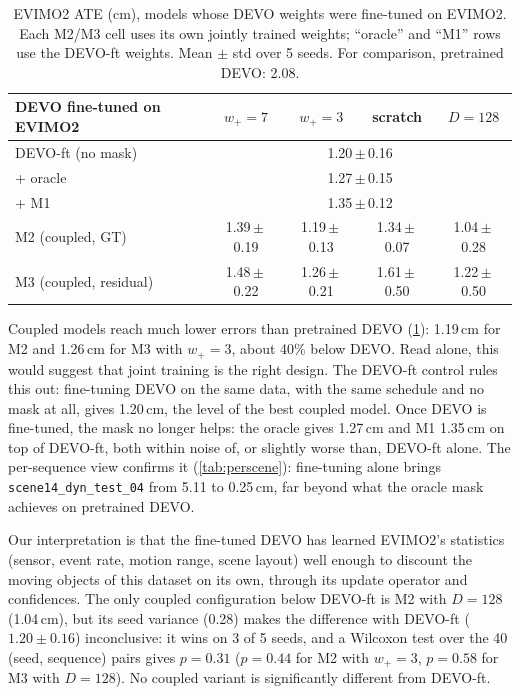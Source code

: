 \documentclass[conference]{IEEEtran}
\newcommand{\code}[1]{\texttt{#1}}
\newcommand{\pmstd}[2]{#1\,$\pm$\,#2}
\newcommand{\wplus}{w_{+}}
\begin{document}
\begin{table}[t]
\centering
\caption{EVIMO2 ATE (cm), models whose DEVO weights were fine-tuned on EVIMO2. Each M2/M3
cell uses its own jointly trained weights; ``oracle'' and ``M1'' rows use the DEVO-ft
weights. Mean $\pm$ std over 5 seeds. For comparison, pretrained DEVO: 2.08.}
\label{tab:finetuned}
\begin{tabular}{lcccc}
\toprule
DEVO fine-tuned on EVIMO2 & $\wplus = 7$ & $\wplus = 3$ & scratch & $D = 128$ \\
\midrule
DEVO-ft (no mask) & \multicolumn{4}{c}{\pmstd{1.20}{0.16}} \\
+ oracle & \multicolumn{4}{c}{\pmstd{1.27}{0.15}} \\
+ M1 & \multicolumn{4}{c}{\pmstd{1.35}{0.12}} \\
\midrule
M2 (coupled, GT) & \pmstd{1.39}{0.19} & \pmstd{1.19}{0.13} & \pmstd{1.34}{0.07} & \pmstd{1.04}{0.28} \\
M3 (coupled, residual) & \pmstd{1.48}{0.22} & \pmstd{1.26}{0.21} & \pmstd{1.61}{0.50} & \pmstd{1.22}{0.50} \\
\bottomrule
\end{tabular}
\end{table}

Coupled models reach much lower errors than pretrained DEVO (\cref{tab:finetuned}):
1.19\,cm for M2 and 1.26\,cm for M3 with $\wplus = 3$, about 40\% below DEVO. Read alone,
this would suggest that joint training is the right design. The DEVO-ft control rules this
out: fine-tuning DEVO on the same data, with the same schedule and no mask at all, gives
1.20\,cm, the level of the best coupled model. Once DEVO is fine-tuned, the mask no longer
helps: the oracle gives 1.27\,cm and M1 1.35\,cm on top of DEVO-ft, both within noise of,
or slightly worse than, DEVO-ft alone. The per-sequence view confirms it
(\cref{tab:perscene}): fine-tuning alone brings \code{scene14\_dyn\_test\_04} from 5.11 to
0.25\,cm, far beyond what the oracle mask achieves on pretrained DEVO.

Our interpretation is that the fine-tuned DEVO has learned EVIMO2's statistics (sensor,
event rate, motion range, scene layout) well enough to discount the moving objects of this
dataset on its own, through its update operator and confidences. The only coupled
configuration below DEVO-ft is M2 with $D = 128$ (1.04\,cm), but its seed variance (0.28)
makes the difference with DEVO-ft ($1.20 \pm 0.16$) inconclusive: it wins on 3 of 5 seeds,
and a Wilcoxon test over the 40 (seed, sequence) pairs gives $p = 0.31$ ($p = 0.44$ for M2
with $\wplus = 3$, $p = 0.58$ for M3 with $D = 128$). No coupled variant is significantly
different from DEVO-ft.
\end{document}
